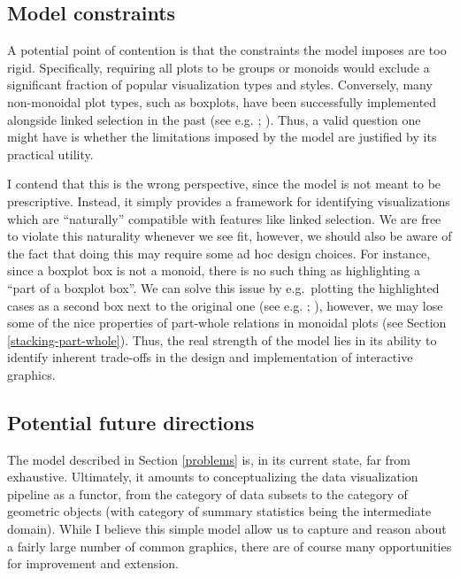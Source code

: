 \documentclass[
  openany]{book}
\theoremstyle{definition}
\theoremstyle{definition}
\theoremstyle{definition}
\theoremstyle{definition}
\theoremstyle{remark}
\begin{document}
\subsection{Model constraints}\label{model-constraints}

A potential point of contention is that the constraints the model imposes are too rigid. Specifically, requiring all plots to be groups or monoids would exclude a significant fraction of popular visualization types and styles. Conversely, many non-monoidal plot types, such as boxplots, have been successfully implemented alongside linked selection in the past (see e.g. ; ). Thus, a valid question one might have is whether the limitations imposed by the model are justified by its practical utility.

I contend that this is the wrong perspective, since the model is not meant to be prescriptive. Instead, it simply provides a framework for identifying visualizations which are ``naturally'' compatible with features like linked selection. We are free to violate this naturality whenever we see fit, however, we should also be aware of the fact that doing this may require some ad hoc design choices. For instance, since a boxplot box is not a monoid, there is no such thing as highlighting a ``part of a boxplot box''. We can solve this issue by e.g.~plotting the highlighted cases as a second box next to the original one (see e.g. ; ), however, we may lose some of the nice properties of part-whole relations in monoidal plots (see Section \ref{stacking-part-whole}). Thus, the real strength of the model lies in its ability to identify inherent trade-offs in the design and implementation of interactive graphics.

\subsection{Potential future directions}\label{potential-future-directions}

The model described in Section \ref{problems} is, in its current state, far from exhaustive. Ultimately, it amounts to conceptualizing the data visualization pipeline as a functor, from the category of data subsets to the category of geometric objects (with category of summary statistics being the intermediate domain). While I believe this simple model allow us to capture and reason about a fairly large number of common graphics, there are of course many opportunities for improvement and extension.
\end{document}
